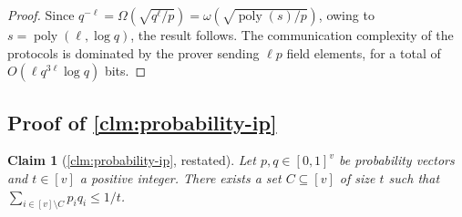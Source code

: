 \documentclass[a4paper,UKenglish,cleveref, autoref, thm-restate]{lipics-v2021}
\newtheorem{claim}[theorem]{Claim}
\theoremstyle{definition}
\newcommand{\poly}{\operatorname{poly}}
\newcommand{\vcommitlength}{v}
\newcommand{\pcommitlength}{p}
\newcommand{\fieldsize}{q}
\begin{document}
\begin{proof}
    Since $\fieldsize^{-\ell} = \Omega\left(\sqrt{\fieldsize^\ell/\pcommitlength}\right)= \omega\left(\sqrt{\poly(s)/\pcommitlength}\right)$, owing to $s = \poly(\ell, \log \fieldsize)$, the result follows. The communication complexity of the protocols is dominated by the prover sending $\ell \pcommitlength$ field elements, for a total of $O(\ell \fieldsize^{3 \ell} \log \fieldsize)$ bits.
\end{proof}

\subsection{Proof of \texorpdfstring{\cref{clm:probability-ip}}{Claim \ref{clm:probability-ip}}}
\label{sec:deferred-probability-ip}

\begin{claim}[\cref{clm:probability-ip}, restated]
    Let $p, q \in [0,1]^\vcommitlength$ be probability vectors and $t \in [\vcommitlength]$ a positive integer. There exists a set $C \subseteq [\vcommitlength]$ of size $t$ such that $\sum_{i \in [\vcommitlength] \setminus C} p_i q_i \leq 1/t$.
\end{claim}
\end{document}
